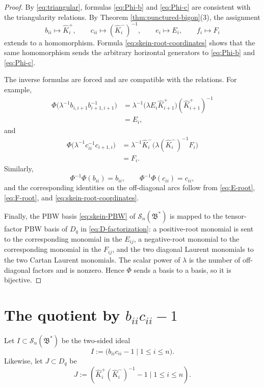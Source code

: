 \documentclass[11pt]{amsart}
\numberwithin{equation}{section}
\theoremstyle{definition}
\theoremstyle{remark}
\newcommand{\bcS}{\mathcal{S}}
\newcommand{\fB}{\mathfrak{B}}
\begin{document}
\begin{proof}
By \eqref{eq:triangular}, formulas \eqref{eq:Phi-b} and \eqref{eq:Phi-c} are
consistent with the triangularity relations.  By Theorem
\ref{thm:punctured-bigon}(3), the assignment
\[
b_{ii}\longmapsto \widehat K_i^{+},
\qquad
c_{ii}\longmapsto (\widehat K_i^{-})^{-1},
\qquad
e_i\longmapsto E_i,
\qquad
f_i\longmapsto F_i
\]
extends to a homomorphism.  Formula \eqref{eq:skein-root-coordinates} shows
that the same homomorphism sends the arbitrary horizontal generators to
\eqref{eq:Phi-b} and \eqref{eq:Phi-c}.

The inverse formulas are forced and are compatible with the relations.  For
example,
\[
\begin{aligned}
\Phi\bigl(\lambda^{-1}b_{i,i+1}b_{i+1,i+1}^{-1}\bigr)
&=\lambda^{-1}
 \bigl(\lambda E_i\widehat K_{i+1}^{+}\bigr)
 (\widehat K_{i+1}^{+})^{-1}\\
&=E_i,
\end{aligned}
\]
and
\[
\begin{aligned}
\Phi\bigl(\lambda^{-1}c_{ii}^{-1}c_{i+1,i}\bigr)
&=\lambda^{-1}\widehat K_i^{-}
 \bigl(\lambda(\widehat K_i^{-})^{-1}F_i\bigr)\\
&=F_i.
\end{aligned}
\]
Similarly,
\[
\Phi^{-1}\Phi(b_{ii})=b_{ii},
\qquad
\Phi^{-1}\Phi(c_{ii})=c_{ii},
\]
and the corresponding identities on the off-diagonal arcs follow from
\eqref{eq:E-root}, \eqref{eq:F-root}, and
\eqref{eq:skein-root-coordinates}.

Finally, the PBW basis \eqref{eq:skein-PBW} of \(\bcS_n(\fB^*)\) is mapped to
the tensor-factor PBW basis of \(D_q\) in
\eqref{eq:D-factorization}: a positive-root monomial is sent to the
corresponding monomial in the \(E_{ij}\), a negative-root monomial to the
corresponding monomial in the \(F_{ij}\), and the two diagonal Laurent
monomials to the two Cartan Laurent monomials.  The scalar power of
\(\lambda\) is the number of off-diagonal factors and is nonzero.  Hence
\(\Phi\) sends a basis to a basis, so it is bijective.
\end{proof}

\section{The quotient by \(b_{ii}c_{ii}-1\)}

Let \(I\subset\bcS_n(\fB^*)\) be the two-sided ideal
\begin{equation}\label{eq:I}
I:=\bigl(b_{ii}c_{ii}-1\mid 1\le i\le n\bigr).
\end{equation}
Likewise, let \(J\subset D_q\) be
\begin{equation}\label{eq:J}
J:=\left(\widehat K_i^{+}(\widehat K_i^{-})^{-1}-1
       \mid 1\le i\le n\right).
\end{equation}
\end{document}
